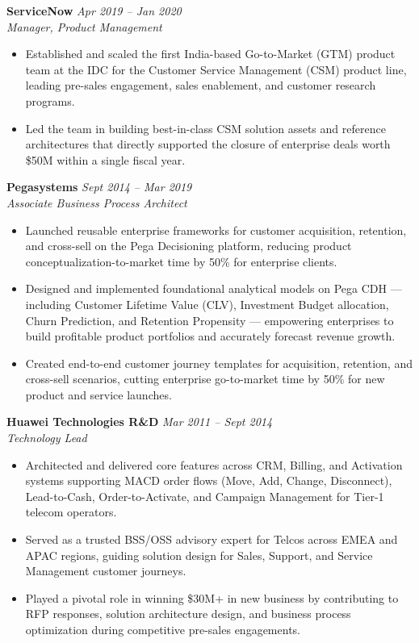 \documentclass{article}
\newcommand{\job}[3]{%
    \vspace{6pt}%
    {\textbf{#1} \hfill \textit{#3}}\\[1pt]%
    {\textit{#2}}\par%
    \vspace{2pt}%
}
\begin{document}
\job{ServiceNow}{Manager, Product Management}{Apr 2019 -- Jan 2020}
\begin{itemize}
    \item Established and scaled the first India-based Go-to-Market (GTM) product team at the IDC for the Customer Service Management (CSM) product line, leading pre-sales engagement, sales enablement, and customer research programs.

    \item Led the team in building best-in-class CSM solution assets and reference architectures that directly supported the closure of enterprise deals worth \$50M within a single fiscal year.
\end{itemize}

\job{Pegasystems}{Associate Business Process Architect}{Sept 2014 -- Mar 2019}
\begin{itemize}
    \item Launched reusable enterprise frameworks for customer acquisition, retention, and cross-sell on the Pega Decisioning platform, reducing product conceptualization-to-market time by 50\% for enterprise clients.

    \item Designed and implemented foundational analytical models on Pega CDH — including Customer Lifetime Value (CLV), Investment Budget allocation, Churn Prediction, and Retention Propensity — empowering enterprises to build profitable product portfolios and accurately forecast revenue growth.

    \item Created end-to-end customer journey templates for acquisition, retention, and cross-sell scenarios, cutting enterprise go-to-market time by 50\% for new product and service launches.
\end{itemize}

\job{Huawei Technologies R\&D}{Technology Lead}{Mar 2011 -- Sept 2014}
\begin{itemize}
    \item Architected and delivered core features across CRM, Billing, and Activation systems supporting MACD order flows (Move, Add, Change, Disconnect), Lead-to-Cash, Order-to-Activate, and Campaign Management for Tier-1 telecom operators.

    \item Served as a trusted BSS/OSS advisory expert for Telcos across EMEA and APAC regions, guiding solution design for Sales, Support, and Service Management customer journeys.

    \item Played a pivotal role in winning \$30M+ in new business by contributing to RFP responses, solution architecture design, and business process optimization during competitive pre-sales engagements.
\end{itemize}
\end{document}
